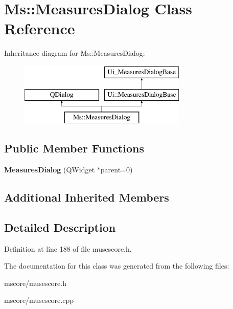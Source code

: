 \hypertarget{class_ms_1_1_measures_dialog}{}\section{Ms\+:\+:Measures\+Dialog Class Reference}
\label{class_ms_1_1_measures_dialog}
Inheritance diagram for Ms\+:\+:Measures\+Dialog\+:\begin{figure}[H]
\begin{center}
\leavevmode
\includegraphics[height=3.000000cm]{class_ms_1_1_measures_dialog}
\end{center}
\end{figure}
\subsection*{Public Member Functions}
\begin{DoxyCompactItemize}
\item 
\mbox{\label{class_ms_1_1_measures_dialog_a07cb3c56ca1e2c4de4eea9f5b427f232}} 
{\bfseries Measures\+Dialog} (Q\+Widget $\ast$parent=0)
\end{DoxyCompactItemize}
\subsection*{Additional Inherited Members}


\subsection{Detailed Description}


Definition at line 188 of file musescore.\+h.



The documentation for this class was generated from the following files\+:\begin{DoxyCompactItemize}
\item 
mscore/musescore.\+h\item 
mscore/musescore.\+cpp\end{DoxyCompactItemize}

